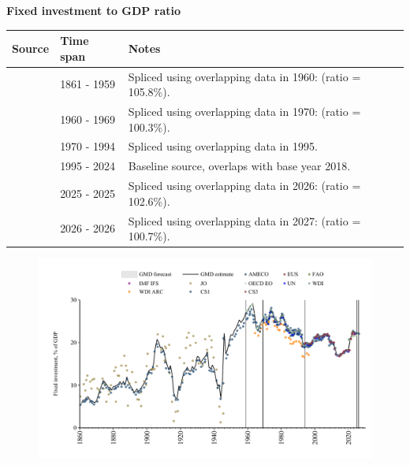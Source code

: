 \documentclass[12pt,a4paper,landscape]{article}
\begin{document}
\begin{adjustbox}{max totalsize={\paperwidth}{\paperheight},center}
\begin{minipage}[t][\textheight][t]{\textwidth}
\vspace*{0.5cm}
{}
\begin{center}
{\Large\bfseries Fixed investment to GDP ratio}
\end{center}
\vspace{0.5cm}
\begin{table}[H]
\centering
\small
\begin{tabular}{|l|l|l|}
\hline
\textbf{Source} & \textbf{Time span} & \textbf{Notes} \\
\hline
\rowcolor{white}\cite{CS1_ITA}& 1861 - 1959 &Spliced using overlapping data in 1960: (ratio = 105.8\%). \\
\rowcolor{lightgray}\cite{OECD_EO}& 1960 - 1969 &Spliced using overlapping data in 1970: (ratio = 100.3\%). \\
\rowcolor{white}\cite{WDI}& 1970 - 1994 &Spliced using overlapping data in 1995. \\
\rowcolor{lightgray}\cite{EUS}& 1995 - 2024 &Baseline source, overlaps with base year 2018. \\
\rowcolor{white}\cite{OECD_EO}& 2025 - 2025 &Spliced using overlapping data in 2026: (ratio = 102.6\%). \\
\rowcolor{lightgray}\cite{AMECO}& 2026 - 2026 &Spliced using overlapping data in 2027: (ratio = 100.7\%). \\
\hline
\end{tabular}
\end{table}
\begin{figure}[H]
\centering
\includegraphics[width=\textwidth,height=0.6\textheight,keepaspectratio]{graphs/ITA_finv_GDP.pdf}
\end{figure}
\end{minipage}
\end{adjustbox}
\end{document}
